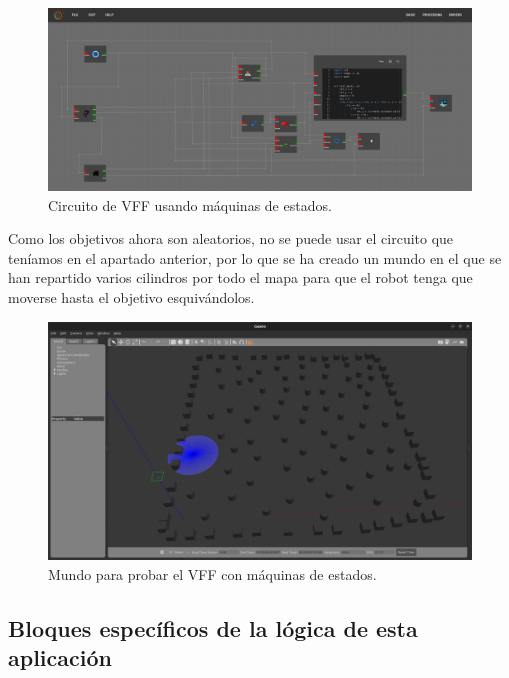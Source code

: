 \begin{figure} [H]
    \begin{center}
        \includegraphics[width=13cm]{figs/c6/FSM_circuit.png}
    \end{center}
    \caption[Circuito VFF con FSM]{Circuito de VFF usando máquinas de estados.}
    \label{fig:FSM_circ}
\end{figure}

Como los objetivos ahora son aleatorios, no se puede usar el circuito que teníamos en el apartado anterior, por lo que se ha creado un mundo en el que se han
repartido varios cilindros por todo el mapa para que el robot tenga que moverse hasta el objetivo esquivándolos.

\begin{figure} [H]
    \begin{center}
        \includegraphics[width=13cm]{figs/c6/FSM_world.png}
    \end{center}
    \caption[Mundo VFF con FSM]{Mundo para probar el VFF con máquinas de estados.}
    \label{fig:FSM_world}
\end{figure}

\subsection{Bloques específicos de la lógica de esta aplicación}
\label{subsec:spec_bloques_FSM}

